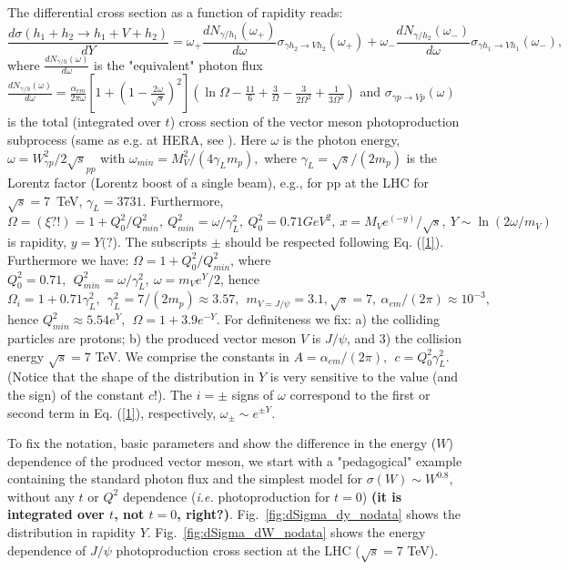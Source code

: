 \documentclass[12pt]{article}
\begin{document}
The differential cross section as a function of rapidity reads:
 \begin{equation}\label{1}
\frac{d\sigma (h_1+h_2\rightarrow h_1+V+h_2)}{dY}=\omega_+\frac{dN_{\gamma/h_1}(\omega_+)}{d\omega}\sigma_{\gamma h_2\rightarrow Vh_2}(\omega_+)+
\omega_-\frac{dN_{\gamma/h_2}(\omega_-)}{d\omega}\sigma_{\gamma h_1\rightarrow Vh_1}(\omega_-),
\end{equation}
where $\frac{dN_{\gamma/h}(\omega)}{d\omega}$ is the "equivalent" photon flux \cite{Review} 
$\frac{dN_{\gamma/h}(\omega)}{d\omega}=\frac{\alpha_{em}}{2\pi\omega}[1+(1-\frac{2\omega}{\sqrt{s}})^2]
(\ln\Omega-\frac{11}{6}+\frac{3}{\Omega}-\frac{3}{2\Omega^2}+\frac{1}{3\Omega^3})$
and $\sigma_{\gamma p\rightarrow Vp}(\omega)$ is the total (integrated over $t$) cross section of the vector meson photoproduction subprocess (same as e.g. at HERA, see \cite{Capua, Fazio}). Here $\omega$ is the photon energy, $\omega=W^2_{\gamma p}/2\sqrt s_{pp}$ with
$\omega_{min}=M_V^2/(4\gamma_Lm_p),$ where $\gamma_L=\sqrt s/(2m_p)$ 
is the Lorentz factor (Lorentz boost of a single beam), e.g., for pp at the LHC for $\sqrt{s}=7$~TeV,
$\gamma_L=3731$.
Furthermore,
$\Omega=(\xi ?!)=1+Q_0^2/Q_{min}^2,\  Q_{min}^2=\omega/\gamma_L^2,\   Q_0^2=0.71GeV^2,\   x=M_Ve^{(-y)}/\sqrt s,\  Y\sim\ln(2\omega/m_V)$ is rapidity, $y=Y(?$).
 The subscripts $\pm$ should be respected following Eq. (\ref{1}).
Furthermore we have: $\Omega=1+Q^2_0/Q^2_{min}$, where $Q_0^2=0.71,\ \ Q_{min}^2=\omega/\gamma^2_L,\ \omega=m_Ve^Y/2$, hence $\Omega_i=1+0.71\gamma_L^2,\ \ \gamma_L^2=7/(2m_p)\approx 3.57, \  \
m_{V=J/\psi}=3.1, \sqrt{s}=7, \ \alpha_{em}/(2\pi)\approx 10^{-3},$ hence $Q^2_{min}\approx 5.54e^Y,\ \ \Omega=1+3.9e^{-Y}$. For definiteness we fix: a) the colliding particles are protons;
b) the produced vector meson $V$ is $J/\psi$, and 3) the collision energy $\sqrt s=7$ TeV.
We comprise the constants in $A=\alpha_{em}/(2\pi),\ \  c=Q_0^2\gamma_L^2$.
(Notice that the shape of the distribution in $Y$ is very sensitive to the value (and the sign) of the constant $c$!). The $i=\pm$ signs of $\omega$ correspond to the first or second term in Eq. (\ref{1}), respectively, $\omega_{\pm}\sim e^{\pm Y}$.

To fix the notation, basic parameters and show the difference in the energy ($W$) dependence of the produced vector meson, we start with a "pedagogical" example containing the standard photon flux and the simplest model for $\sigma(W)\sim W^{0.8}$, without any $t$ or $Q^2$ dependence ({\it i.e.} photoproduction for $t=0$) {\tiny\bf(it is integrated over $t$, not $t=0$, right?)}.
Fig.~\ref{fig:dSigma_dy_nodata} shows the distribution in rapidity $Y$. Fig.~\ref{fig:dSigma_dW_nodata} shows the energy dependence of $J/\psi$ photoproduction cross section at the LHC ($\sqrt{s}=7$ TeV).
\end{document}
